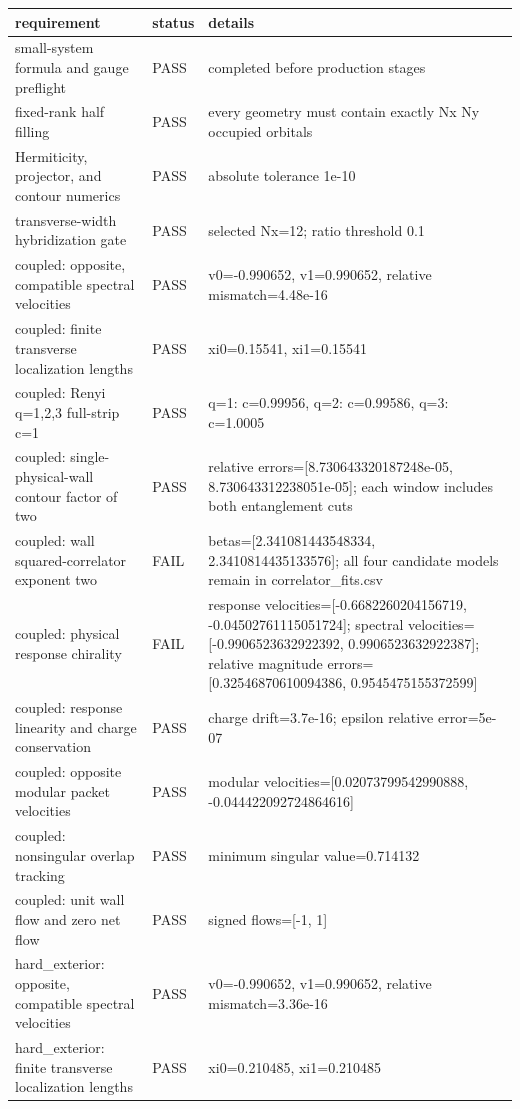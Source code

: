 \documentclass[aps,prb,onecolumn,nofootinbib,superscriptaddress]{revtex4-2}
\begin{document}
\begin{longtable}{p{}p{}p{}}
\toprule
requirement & status & details \\
\midrule
small-system formula and gauge preflight & PASS & completed before production stages \\
fixed-rank half filling & PASS & every geometry must contain exactly Nx Ny occupied orbitals \\
Hermiticity, projector, and contour numerics & PASS & absolute tolerance 1e-10 \\
transverse-width hybridization gate & PASS & selected Nx=12; ratio threshold 0.1 \\
coupled: opposite, compatible spectral velocities & PASS & v0=-0.990652, v1=0.990652, relative mismatch=4.48e-16 \\
coupled: finite transverse localization lengths & PASS & xi0=0.15541, xi1=0.15541 \\
coupled: Renyi q=1,2,3 full-strip c=1 & PASS & q=1: c=0.99956, q=2: c=0.99586, q=3: c=1.0005 \\
coupled: single-physical-wall contour factor of two & PASS & relative errors=[8.730643320187248e-05, 8.730643312238051e-05]; each window includes both entanglement cuts \\
coupled: wall squared-correlator exponent two & FAIL & betas=[2.341081443548334, 2.3410814435133576]; all four candidate models remain in correlator\_fits.csv \\
coupled: physical response chirality & FAIL & response velocities=[-0.6682260204156719, -0.04502761115051724]; spectral velocities=[-0.9906523632922392, 0.9906523632922387]; relative magnitude errors=[0.32546870610094386, 0.9545475155372599] \\
coupled: response linearity and charge conservation & PASS & charge drift=3.7e-16; epsilon relative error=5e-07 \\
coupled: opposite modular packet velocities & PASS & modular velocities=[0.02073799542990888, -0.044422092724864616] \\
coupled: nonsingular overlap tracking & PASS & minimum singular value=0.714132 \\
coupled: unit wall flow and zero net flow & PASS & signed flows=[-1, 1] \\
hard\_exterior: opposite, compatible spectral velocities & PASS & v0=-0.990652, v1=0.990652, relative mismatch=3.36e-16 \\
hard\_exterior: finite transverse localization lengths & PASS & xi0=0.210485, xi1=0.210485 \\

\end{longtable}
\end{document}
